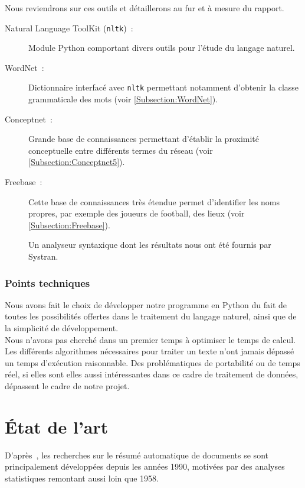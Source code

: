 \documentclass[a4paper, 12pt]{article}
\newcommand{\pyt}[1]{\texttt{#1}}%
\begin{document}
Nous reviendrons sur ces outils et détaillerons au fur et à mesure du rapport.

\begin{description}
	\item[Natural Language ToolKit (\pyt{nltk})~: ]Module Python comportant divers outils pour l'étude du langage naturel.
	\item[WordNet~: ]Dictionnaire interfacé avec \pyt{nltk} permettant notamment d'obtenir la classe grammaticale des mots (voir \ref{Subsection:WordNet}).
	\item[Conceptnet~: ]Grande base de connaissances permettant d'établir la proximité conceptuelle entre différents termes du réseau (voir \ref{Subsection:Conceptnet5}).
	\item[Freebase~: ]Cette base de connaissances très étendue permet d'identifier les noms propres, par exemple des joueurs de football, des lieux (voir \ref{Subsection:Freebase}).

	\item[] Un analyseur syntaxique dont les résultats nous ont été fournis par Systran.
\end{description}

\subsubsection{Points techniques}

Nous avons fait le choix de développer notre programme en Python du fait de toutes les possibilités offertes dans le traitement du langage naturel, ainsi que de la simplicité de développement.\\

Nous n'avons pas cherché dans un premier temps à optimiser le temps de calcul. Les différents algorithmes nécessaires pour traiter un texte n'ont jamais dépassé un temps d'exécution raisonnable. Des problématiques de portabilité ou de temps réel, si elles sont elles aussi intéressantes dans ce cadre de traitement de données, dépassent le cadre de notre projet.


\section{État de l'art} %



D'après~\cite{jones_automatic_2007}, les recherches sur le résumé automatique de documents se sont principalement développées depuis les années 1990, motivées par des analyses statistiques remontant aussi loin que 1958.\\
\end{document}
